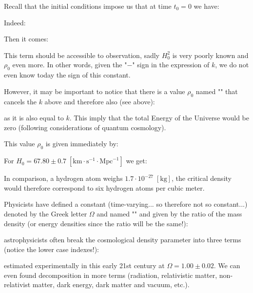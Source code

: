 	Recall that the initial conditions impose us that at time $t_0=0$ we have:
	
	Indeed:
	
	Then it comes:
	
	This term should be accessible to observation, sadly $H_0^2$ is very poorly known and $\rho_0$ even more. In other words, given the "$-$" sign in the expression of $k$, we do not even know today the sign of this constant.
	
	However, it may be important to notice that there is a value $\rho_0$ named "" that cancels the $k$ above and therefore also (see above):
	
	as it is also equal to $k$. This imply that the total Energy of the Universe would be zero (following considerations of quantum cosmology).

	This value $\rho_0$ is given immediately by:
	
	For $H_0=67.80\pm 0.7\;[\text{km} \cdot\text{s}^{-1}\cdot\text{Mpc}^{-1}]$ we get:
	
	In comparison, a hydrogen atom weighs $1.7\cdot 10^{-27}\;[\text{kg}]$, the critical density would therefore correspond to six hydrogen atoms per cubic meter.

	Physicists have defined a constant (time-varying... so therefore not so constant...) denoted by the Greek letter $\Omega$ and named "" and given by the ratio of the mass density (or energy densities since the ratio will be the same!):
	
	astrophysicists often break the cosmological density parameter into three terms (notice the lower case indexes!):
	
	estimated experimentally in this early 21st century at $\Omega=1.00\pm0.02$. We can even found decomposition in more terms (radiation, relativistic matter, non-relativist matter, dark energy, dark matter and vacuum, etc.).
	
